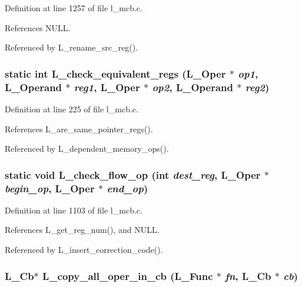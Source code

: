 Definition at line 1257 of file l\_\-mcb.c.

References NULL.

Referenced by L\_\-rename\_\-src\_\-reg().
\subsubsection{\setlength{\rightskip}{0pt plus 5cm}static int L\_\-check\_\-equivalent\_\-regs (L\_\-Oper $\ast$ {\em op1}, L\_\-Operand $\ast$ {\em reg1}, L\_\-Oper $\ast$ {\em op2}, L\_\-Operand $\ast$ {\em reg2})\hspace{0.3cm}{\tt  [static]}}\label{l__mcb_8c_7298a80fd887066c0a903aca94cd52d9}




Definition at line 225 of file l\_\-mcb.c.

References L\_\-are\_\-same\_\-pointer\_\-regs().

Referenced by L\_\-dependent\_\-memory\_\-ops().
\subsubsection{\setlength{\rightskip}{0pt plus 5cm}static void L\_\-check\_\-flow\_\-op (int {\em dest\_\-reg}, L\_\-Oper $\ast$ {\em begin\_\-op}, L\_\-Oper $\ast$ {\em end\_\-op})\hspace{0.3cm}{\tt  [static]}}\label{l__mcb_8c_4320cbf6282b78d2ac158ce94fd10227}




Definition at line 1103 of file l\_\-mcb.c.

References L\_\-get\_\-reg\_\-num(), and NULL.

Referenced by L\_\-insert\_\-correction\_\-code().
\subsubsection{\setlength{\rightskip}{0pt plus 5cm}L\_\-Cb$\ast$ L\_\-copy\_\-all\_\-oper\_\-in\_\-cb (L\_\-Func $\ast$ {\em fn}, L\_\-Cb $\ast$ {\em cb})}\label{l__mcb_8c_d7ea649eb15d34bb940fea7fc01f55cf}




